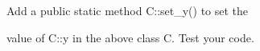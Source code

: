 Add a public static method C::set\_y() to set the

value of C::y in the above class C. Test your code.

